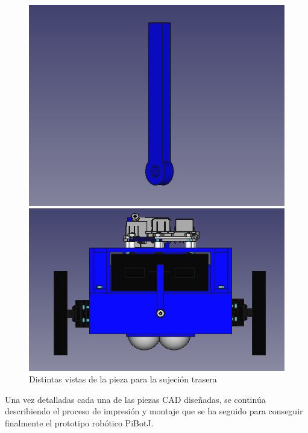 \begin{figure}[ht!]
	\centering
	\begin{minipage}{0.365\linewidth}
		\centering
		\includegraphics[width=\linewidth]{figs/cap5/trasera2.png}
	\end{minipage}
	\hspace{1cm}
	\begin{minipage}{0.45\linewidth}
		\centering
		\includegraphics[width=\linewidth]{figs/cap5/traseracon.png}
	\end{minipage}
	\caption{Distintas vistas de la pieza para la sujeción trasera}
	\label{fig:ptrasera}
\end{figure}

Una vez detalladas cada una de las piezas CAD diseñadas, se continúa describiendo el proceso de impresión y montaje que se ha seguido para conseguir finalmente el prototipo robótico PiBotJ.
  

